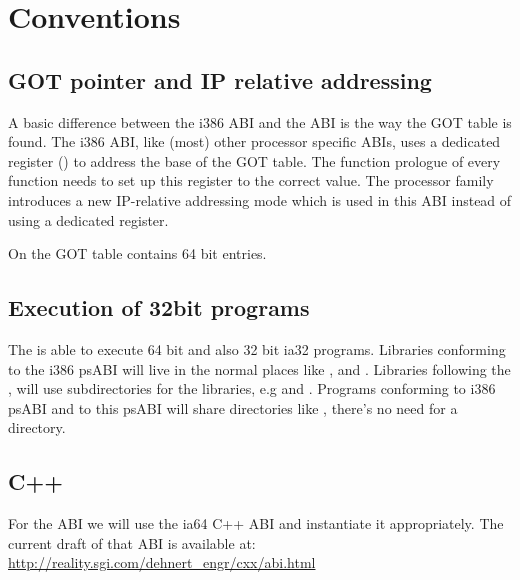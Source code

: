 \chapter{Conventions}



\section{GOT pointer and IP relative addressing}

A basic difference between the i386 ABI and the \xARCH ABI is the
way the GOT table is found.  The i386 ABI, like (most) other processor
specific ABIs, uses a dedicated register () to address the
base of the GOT table.  The function prologue of every function needs
to set up this register to the correct value.  The \xARCH processor
family introduces a new IP-relative addressing mode which is used in
this ABI instead of using a dedicated register.

On \xARCH the GOT table contains 64 bit entries.

\section{Execution of 32bit programs}


The \xARCH is able to execute 64 bit \xARCH and also 32 bit ia32
programs.  Libraries conforming to the i386 psABI will live in the
normal places like ,  and .
Libraries following the \xARCH, will use  subdirectories
for the libraries, e.g  and .  Programs
conforming to i386 psABI and to this \xARCH psABI will share
directories like , there's no need for a 
directory.


\section{C++\label{section-cpp}}

For the  ABI we will use the ia64 C++ ABI and instantiate it
appropriately.  The current draft of that ABI is available at:\\
\url{http://reality.sgi.com/dehnert_engr/cxx/abi.html}


